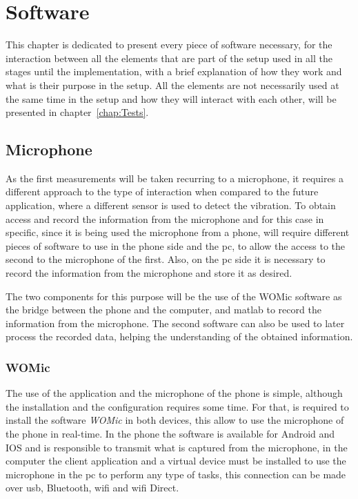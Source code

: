 \cleardoublepage
\chapter{Software}\label{chap:software}
This chapter is dedicated to present every piece of software necessary, for the interaction between all the elements that are part of the setup used in all the stages until the implementation, with a brief explanation of how they work and what is their purpose in the setup. All the elements are not necessarily used at the same time in the setup and how they will interact with each other, will be presented in chapter~\ref{chap:Tests}.
\section{Microphone}
As the first measurements will be taken recurring to a microphone, it requires a different approach to the type of interaction when compared to the future application, where a different sensor is used to detect the vibration. To obtain access and record the information from the microphone and for this case in specific, since it is being used the microphone from a phone, will require different pieces of software to use in the phone side and the \acrshort{pc}, to allow the access to the second to the microphone of the first. Also, on the \acrshort{pc} side it is necessary to record the information from the microphone and store it as desired.

The two components for this purpose will be the use of the WOMic software as the bridge between the phone and the computer, and \acrshort{matlab} to record the information from the microphone. The second software can also be used to later process the recorded data, helping the understanding of the obtained information. 
\subsection*{WOMic}
The use of the application and the microphone of the phone is simple, although the installation and the configuration requires some time. For that, is required to install the software \textit{WOMic} in both devices, this allow to use the microphone of the phone in real-time. In the phone the software is available for Android and IOS and is responsible to transmit what is captured from the microphone, in the computer the client application and a virtual device must be installed to use the microphone in the \acrshort{pc} to perform any type of tasks, this connection can be made over \acrshort{usb}, Bluetooth, \acrshort{wifi} and \acrshort{wifi} Direct.

